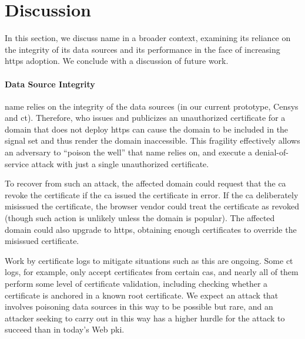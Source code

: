 \section{Discussion}
\label{sec:discussion}

In this section, we discuss \ac{name} in a broader context, examining its
reliance on the integrity of its data sources and its performance in
the face of increasing \ac{https} adoption. We conclude with a discussion of
future work.

\paragraph{Data Source Integrity}
\ac{name} relies on the integrity of the data sources (in our current prototype,
Censys and \ac{ct}). Therefore,  who issues
and publicizes an unauthorized certificate for a domain that does not deploy
\ac{https} can cause the domain to be included in the signal set and thus render
the domain inaccessible. This fragility effectively allows an adversary to
``poison the well'' that \ac{name} relies on, and execute a denial-of-service
attack with just a single unauthorized certificate.

To recover from such an attack, the
affected domain could request that the \ac{ca} revoke the certificate if the
\ac{ca} issued the certificate in error. If the \ac{ca} deliberately misissued
the certificate, the browser vendor could treat the certificate as revoked
(though such action is unlikely unless the domain is popular). The affected
domain could also upgrade to \ac{https}, obtaining enough certificates to
override the misissued certificate. 

Work by certificate logs to mitigate situations such as this are ongoing. Some
\ac{ct} logs, for example, only accept certificates from certain \acp{ca}, and
nearly all of them perform some level of certificate validation, including
checking whether a certificate is anchored in a known root certificate. We
expect an attack that involves poisoning data sources in this way to be possible
but rare, and an attacker seeking to carry out  in this way has a
higher hurdle for the attack to succeed than in today's Web \ac{pki}.

